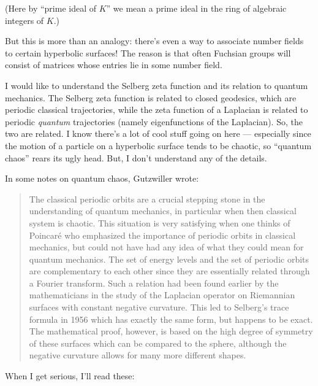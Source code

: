 \documentclass{article}
\begin{document}
(Here by ``prime ideal of \(K\)'' we mean a prime ideal in the ring of
algebraic integers of \(K\).)

But this is more than an analogy: there's even a way to associate number
fields to certain hyperbolic surfaces! The reason is that often Fuchsian
groups will consist of matrices whose entries lie in some number field.

I would like to understand the Selberg zeta function and its relation to
quantum mechanics. The Selberg zeta function is related to closed
geodesics, which are periodic classical trajectories, while the zeta
function of a Laplacian is related to periodic \emph{quantum}
trajectories (namely eigenfunctions of the Laplacian). So, the two are
related. I know there's a lot of cool stuff going on here --- especially
since the motion of a particle on a hyperbolic surface tends to be
chaotic, so ``quantum chaos'' rears its ugly head. But, I don't
understand any of the details.

In some notes on quantum chaos, Gutzwiller wrote:

\begin{quote}
The classical periodic orbits are a crucial stepping stone in the
understanding of quantum mechanics, in particular when then classical
system is chaotic. This situation is very satisfying when one thinks of
Poincaré who emphasized the importance of periodic orbits in classical
mechanics, but could not have had any idea of what they could mean for
quantum mechanics. The set of energy levels and the set of periodic
orbits are complementary to each other since they are essentially
related through a Fourier transform. Such a relation had been found
earlier by the mathematicians in the study of the Laplacian operator on
Riemannian surfaces with constant negative curvature. This led to
Selberg's trace formula in 1956 which has exactly the same form, but
happens to be exact. The mathematical proof, however, is based on the
high degree of symmetry of these surfaces which can be compared to the
sphere, although the negative curvature allows for many more different
shapes.
\end{quote}

When I get serious, I'll read these:
\end{document}
